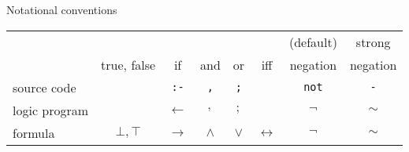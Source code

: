 \begin{frame}[c]{Notational conventions}
  \begin{center}
    \begin{tabular}{|l|ccccccc|}
      \hline
      &             &             &            &            &                 & (default)            & strong         \\
      & true, false & if          & and        & or         & iff             &           negation   &        negation\\
      \hline\hline
      source code   &             &\texttt{:-}  & \texttt{,} & \texttt{;} &                 & \texttt{not}         & \texttt{-}\\
      logic program &             &$\leftarrow$ & $,$        & $;$        &                 & $\neg$               & $\sim$\\
      formula       & $\bot,\top$ &$\rightarrow$& $\wedge$   & $\vee$     &$\leftrightarrow$& $\neg$               & $\sim$\\
      \hline
    \end{tabular}
  \end{center}
\end{frame}
%
